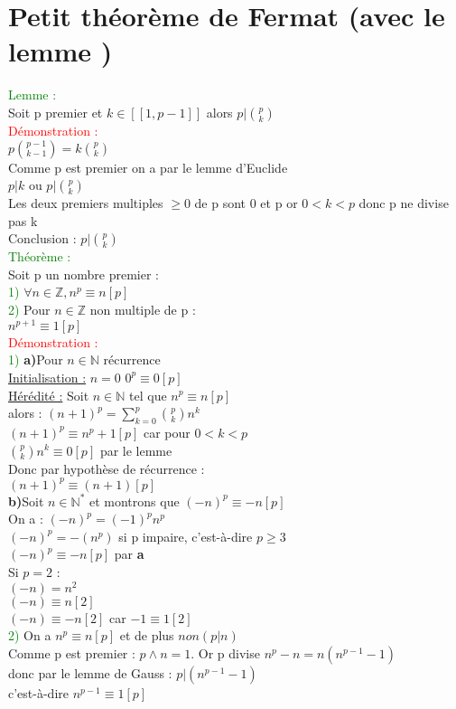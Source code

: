 \documentclass{article}
\begin{document}
\section{Petit théorème de Fermat (avec le lemme )}
\textcolor{green}{Lemme :} \\ 
Soit p premier et $k\in [[1,p-1]]$ alors $p|\binom{p}{k}$ \\ 
\textcolor{red}{Démonstration :} \\ 
$p\binom{p-1}{k-1}=k\binom{p}{k}$ \\ 
Comme p est premier on a par le lemme d'Euclide \\ 
$p|k$ ou $p|\binom{p}{k}$ \\ 
Les deux premiers multiples $\geq 0$ de p sont 0 et p or $0<k<p$ donc p ne divise pas k \\ 
Conclusion : $p|\binom{p}{k}$ \\ 
\textcolor{green}{Théorème :} \\ 
Soit p un nombre premier : \\ 
\textcolor{green}{1)} $\forall n \in \mathbb{Z}, n^p \equiv n [p]$ \\ 
\textcolor{green}{2)} Pour $n \in \mathbb{Z}$ non multiple de p : \\ 
$n^{p+1}\equiv 1[p]$ \\ 
\textcolor{red}{Démonstration :} \\ 
\textcolor{green}{1)} {\bf a)}Pour $n \in \mathbb{N}$ récurrence \\ 
\underline{Initialisation :} $n=0$ $0^p\equiv 0 [p]$ \\ 
\underline{Hérédité :} Soit $n \in \mathbb{N}$ tel que $n^p\equiv n[p]$ \\ 
alors : $(n+1)^p=\sum_{k=0}^p\binom{p}{k}n^k$ \\ 
$(n+1)^p\equiv n^p+1[p]$ car pour $0<k<p$ \\ 
$\binom{p}{k}n^k\equiv 0[p]$ par le lemme \\ 
Donc par hypothèse de récurrence : \\ 
$(n+1)^p \equiv (n+1)[p]$ \\ 
{\bf b)}Soit $n \in \mathbb{N}^\ast$ et montrons que $(-n)^p \equiv -n[p]$ \\ 
On a : $(-n)^p=(-1)^pn^p$ \\ 
$(-n)^p=-(n^p)$ si p impaire, c'est-à-dire $p \geq 3$ \\ 
$(-n)^p\equiv -n[p]$ par {\bf a} \\ 
Si $p=2$ : \\ 
$(-n)=n^2$ \\ 
$(-n)\equiv n[2]$ \\ 
$(-n) \equiv -n[2]$ car $-1 \equiv 1[2]$ \\ 
\textcolor{green}{2)} On a $n^p \equiv n[p]$ et de plus $non(p|n)$ \\ 
Comme p est premier : $p \wedge n=1$. Or p divise $n^p-n=n(n^{p-1}-1)$ \\ 
donc par le lemme de Gauss : $p|(n^{p-1}-1)$ \\ 
c'est-à-dire $n^{p-1}\equiv 1[p]$
\end{document}
